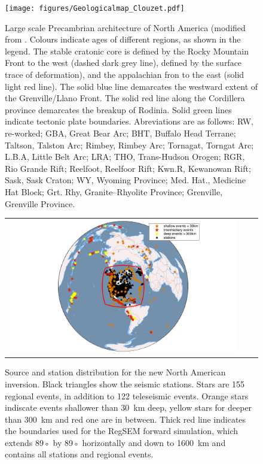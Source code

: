 \documentclass[12pt]{article}
\begin{document}
	\begin{figure}

		\centering
		\centerline{\texttt{[image: figures/Geologicalmap\_Clouzet.pdf]}}

		\caption{\baselineskip 18pt
		Large scale Precambrian architecture of North America (modified from \cite{whitmeyer2007tectonic}. Colours indicate ages of different regions, as shown in the legend. The stable cratonic core is defined by the Rocky Mountain Front to the west (dashed dark grey line), defined by the surface trace of deformation), and the appalachian fron to the east (solid light red line). The solid blue line demarcates the westward extent of the Grenville/Llano Front. The solid red line along the Cordillera province demarcates the breakup of Rodinia. Solid green lines indicate tectonic plate boundaries. Abreviations are as follows: RW, re-worked; GBA, Great Bear Arc; BHT, Buffalo Head Terrane; Taltson, Talston Arc; Rimbey, Rimbey Arc; Tornagat, Torngat Arc; L.B.A, Little Belt Arc; LRA; THO, Trans-Hudson Orogen; RGR, Rio Grande Rift; Reelfoot, Reelfoor Rift; Kwn.R, Kewanowan Rift; Sask, Sask Craton; WY, Wyoming Province; Med. Hat., Medicine Hat Block; Grt. Rhy, Granite–Rhyolite Province; Grenville, Grenville Province.
		}

		\label{mapgeol}

	\end{figure}


	\begin{figure}
		\centering
		\begin{tabular}{ccc}
			\includegraphics[width=1\textwidth]{figures/map_events_stn_global.png}
		\end{tabular}

		\caption{\baselineskip 18pt 
		Source and station distribution for the new North American inversion. Black triangles show the seismic stations. Stars are 155 regional events, in addition to 122 teleseismic events. Orange stars indiscate events shallower than 30~km deep, yellow stars for deeper than 300~km and red one are in between. Thick red line indicates the boundaries used for the RegSEM forward simulation, which extends 89◦ by 89◦ horizontally and down to 1600~km and contains all stations and regional events.}

		\label{map_evt_stn}
	\end{figure}
\end{document}

